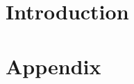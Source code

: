 \documentclass[a4paper,oneside,11pt]{book}
\begin{document}
\frontmatter
\dominitoc %
{   
    \pagestyle{empty}

    
    \cleardoublepage

    
    \cleardoublepage

    \tableofcontents
    \cleardoublepage
}

\mainmatter



\chapter{Introduction}\label{chap:intro}
\myminitoc




\renewcommand{\theHchapter}{A\arabic{chapter}}
\appendix

\chapter{Appendix}

\cleardoublepage

\cleardoublepage
\begingroup
    \raggedright %
    \renewcommand{\UrlFont}{\ttfamily\small}
    \printbibliography[title={References}, heading=bibintoc]
\endgroup

\cleardoublepage
\thispagestyle{empty}
\end{document}
